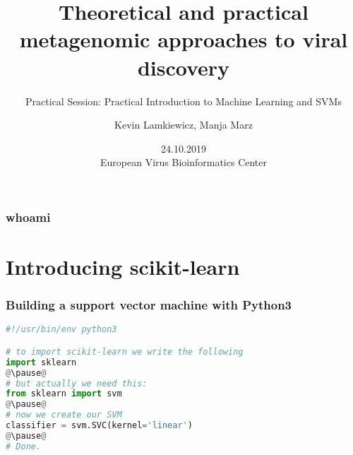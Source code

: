 

\title{Theoretical and practical metagenomic approaches to viral discovery}
\subtitle{Practical Session: Practical Introduction to Machine Learning and SVMs}
\author{Kevin Lamkiewicz, Manja Marz}
\date{24.10.2019\\[1em]European Virus Bioinformatics Center}



\begin{frame}
  \maketitle
\end{frame}

\begin{frame}[c]\frametitle{whoami}
\end{frame}

\section[sklearn]{Introducing scikit-learn}

\begin{frame}[c,fragile]\frametitle{Building a support vector machine with Python3}
  \begin{lstlisting}[language=Python]
#!/usr/bin/env python3

# to import scikit-learn we write the following
import sklearn
@\pause@
# but actually we need this:
from sklearn import svm
@\pause@
# now we create our SVM
classifier = svm.SVC(kernel='linear')
@\pause@
# Done.
  \end{lstlisting}
\end{frame}

